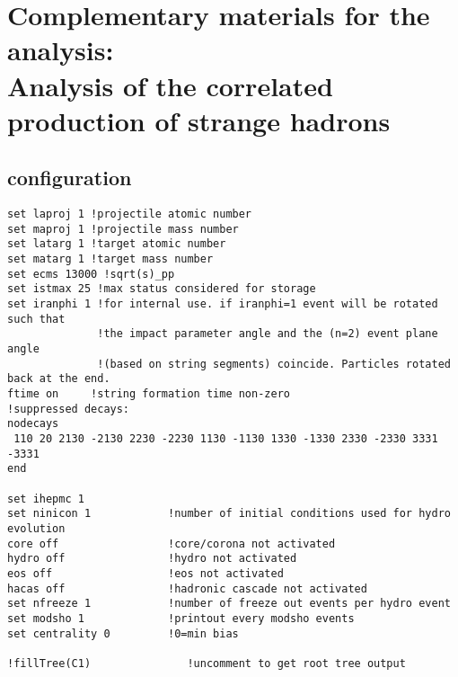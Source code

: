 \chapter{Complementary materials for the analysis:\\Analysis of the correlated production of strange hadrons}
\label{appendix:CorrelatedAnalysis}

\section{\Epos configuration}
\begin{verbatim}
set laproj 1 !projectile atomic number
set maproj 1 !projectile mass number
set latarg 1 !target atomic number
set matarg 1 !target mass number
set ecms 13000 !sqrt(s)_pp
set istmax 25 !max status considered for storage 
set iranphi 1 !for internal use. if iranphi=1 event will be rotated such that 
              !the impact parameter angle and the (n=2) event plane angle
              !(based on string segments) coincide. Particles rotated back at the end. 
ftime on     !string formation time non-zero
!suppressed decays: 
nodecays 
 110 20 2130 -2130 2230 -2230 1130 -1130 1330 -1330 2330 -2330 3331 -3331 
end

set ihepmc 1
set ninicon 1            !number of initial conditions used for hydro evolution
core off                 !core/corona not activated
hydro off                !hydro not activated
eos off                  !eos not activated
hacas off                !hadronic cascade not activated  
set nfreeze 1            !number of freeze out events per hydro event 
set modsho 1             !printout every modsho events
set centrality 0         !0=min bias 

!fillTree(C1)               !uncomment to get root tree output
\end{verbatim}


